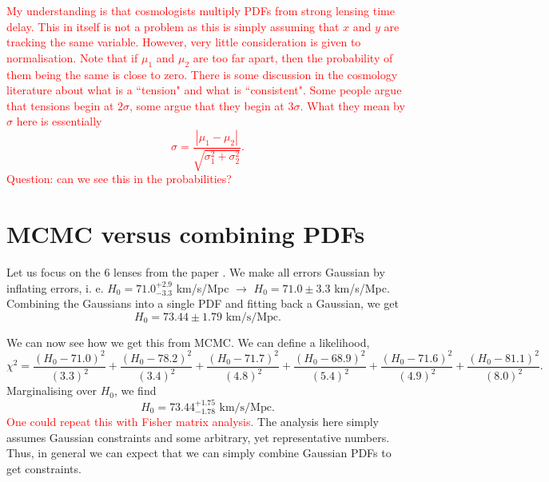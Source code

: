 \documentclass[aps,prl,10pt,twocolumn,superscriptaddress]{revtex4}
\def\red{\textcolor{red}}
\def\be{\begin{equation}}
\def\ee{\end{equation}}
\begin{document}
\red{My understanding is that cosmologists multiply PDFs from strong lensing time delay. This in itself is not a problem as this is simply assuming that $x$ and $y$ are tracking the same variable. However, very little consideration is given to normalisation. Note that if $\mu_1$ and $\mu_2$ are too far apart, then the probability of them being the same is close to zero. There is some discussion in the cosmology literature about what is a ``tension" and what is ``consistent". Some people argue that tensions begin at $2 \sigma$, some argue that they begin at $3 \sigma$. What they mean by $\sigma$ here is essentially 
\be
\sigma = \frac{| \mu_1 - \mu_2 |}{\sqrt{\sigma_1^2 + \sigma_2^2}}. 
\ee
Question: can we see this in the probabilities?}

\section{MCMC versus combining PDFs}
Let us focus on the 6 lenses from the paper \cite{Wong:2019kwg}. We make all errors Gaussian by inflating errors, i. e. $H_0 = 71.0^{+2.9}_{-3.3}$ km/s/Mpc $ \rightarrow$ $H_0 = 71.0 \pm 3.3$ km/s/Mpc. Combining the Gaussians into a single PDF and fitting back a Gaussian, we get
\be
H_0 = 73.44 \pm 1.79 \textrm{ km/s/Mpc}.
\ee

We can now see how we get this from MCMC. We can define a likelihood, 
\be
\chi^2 = \frac{(H_0-71.0)^2}{(3.3)^2} + \frac{(H_0-78.2)^2}{(3.4)^2} + \frac{(H_0-71.7)^2}{(4.8)^2} + \frac{(H_0-68.9)^2}{(5.4)^2} + \frac{(H_0-71.6)^2}{(4.9)^2} + \frac{(H_0-81.1)^2}{(8.0)^2}. 
\ee
Marginalising over $H_0$, we find 
\be
H_0 = 73.44^{+1.75}_{-1.78} \textrm{ km/s/Mpc}.
\ee
\red{One could repeat this with Fisher matrix analysis.}
The analysis here simply assumes Gaussian constraints and some arbitrary, yet representative numbers. Thus, in general we can expect that we can simply combine Gaussian PDFs to get constraints. 
\end{document}
